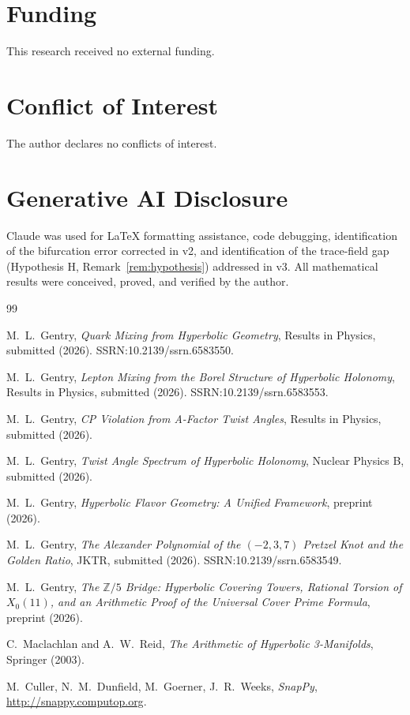 \documentclass[12pt]{article}
\theoremstyle{definition}
\newcommand{\Z}{\mathbb{Z}}
\begin{document}
\section*{Funding}
This research received no external funding.

\section*{Conflict of Interest}
The author declares no conflicts of interest.

\section*{Generative AI Disclosure}
Claude was used for \LaTeX{} formatting assistance, code debugging,
identification of the bifurcation error corrected in v2, and
identification of the trace-field gap (Hypothesis H,
Remark~\ref{rem:hypothesis}) addressed in v3. All mathematical
results were conceived, proved, and verified by the author.

\begin{thebibliography}{99}

M.~L.~Gentry,
\textit{Quark Mixing from Hyperbolic Geometry},
Results in Physics, submitted (2026). SSRN:10.2139/ssrn.6583550.

M.~L.~Gentry,
\textit{Lepton Mixing from the Borel Structure of Hyperbolic Holonomy},
Results in Physics, submitted (2026). SSRN:10.2139/ssrn.6583553.

M.~L.~Gentry,
\textit{CP Violation from A-Factor Twist Angles},
Results in Physics, submitted (2026).

M.~L.~Gentry,
\textit{Twist Angle Spectrum of Hyperbolic Holonomy},
Nuclear Physics B, submitted (2026).

M.~L.~Gentry,
\textit{Hyperbolic Flavor Geometry: A Unified Framework},
preprint (2026).

M.~L.~Gentry,
\textit{The Alexander Polynomial of the $(-2,3,7)$ Pretzel Knot
and the Golden Ratio}, JKTR, submitted (2026).
SSRN:10.2139/ssrn.6583549.

M.~L.~Gentry,
\textit{The $\Z/5$ Bridge: Hyperbolic Covering Towers, Rational
Torsion of $X_0(11)$, and an Arithmetic Proof of the Universal Cover
Prime Formula}, preprint (2026).

C.~Maclachlan and A.~W.~Reid,
\textit{The Arithmetic of Hyperbolic 3-Manifolds},
Springer (2003).

M.~Culler, N.~M.~Dunfield, M.~Goerner, J.~R.~Weeks,
\textit{SnapPy}, \url{http://snappy.computop.org}.

\end{thebibliography}
\end{document}
